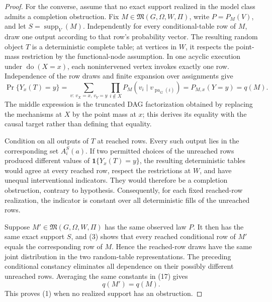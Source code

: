 \documentclass{article}
\begin{document}
\begin{proof}
For the converse, assume that no exact support realized in the model class admits a completion obstruction.  Fix \(M\in\mathfrak M(G,\Omega,W,\Pi)\), write \(P=P_M(V)\), and let \(S=\operatorname{supp}_V(M)\).  Independently for every conditional-table row of \(M\), draw one output according to that row's probability vector.  The resulting random object \(T\) is a deterministic complete table; at vertices in \(W\), it respects the point-mass restriction by the functional-node assumption.  In one acyclic execution under \(\operatorname{do}(X=x)\), each nonintervened vertex invokes exactly one row.  Independence of the row draws and finite expansion over assignments give
\[
 \Pr\{Y_x(T)=y\}
 =\sum_{v:\,v_X=x,\,v_Y=y}
 \prod_{i\notin X}P_M(v_i\mid v_{\operatorname{pa}_G(i)})
 =P_{M,x}(Y=y)=q(M).
 \tag{17}
\]
The middle expression is the truncated DAG factorization obtained by replacing the mechanisms at \(X\) by the point mass at \(x\); this derives its equality with the causal target rather than defining that equality.

Condition on all outputs of \(T\) at reached rows.  Every such output lies in the corresponding set \(A_i^S(a)\).  If two permitted choices of the unreached rows produced different values of \(\mathbf 1\{Y_x(T)=y\}\), the resulting deterministic tables would agree at every reached row, respect the restrictions at \(W\), and have unequal interventional indicators.  They would therefore be a completion obstruction, contrary to hypothesis.  Consequently, for each fixed reached-row realization, the indicator is constant over all deterministic fills of the unreached rows.

Suppose \(M'\in\mathfrak M(G,\Omega,W,\Pi)\) has the same observed law \(P\).  It then has the same exact support \(S\), and (3) shows that every reached conditional row of \(M'\) equals the corresponding row of \(M\).  Hence the reached-row draws have the same joint distribution in the two random-table representations.  The preceding conditional constancy eliminates all dependence on their possibly different unreached rows.  Averaging the same constants in (17) gives
\[
 q(M')=q(M).
 \tag{18}
\]
This proves (1) when no realized support has an obstruction.


\end{proof}
\end{document}
